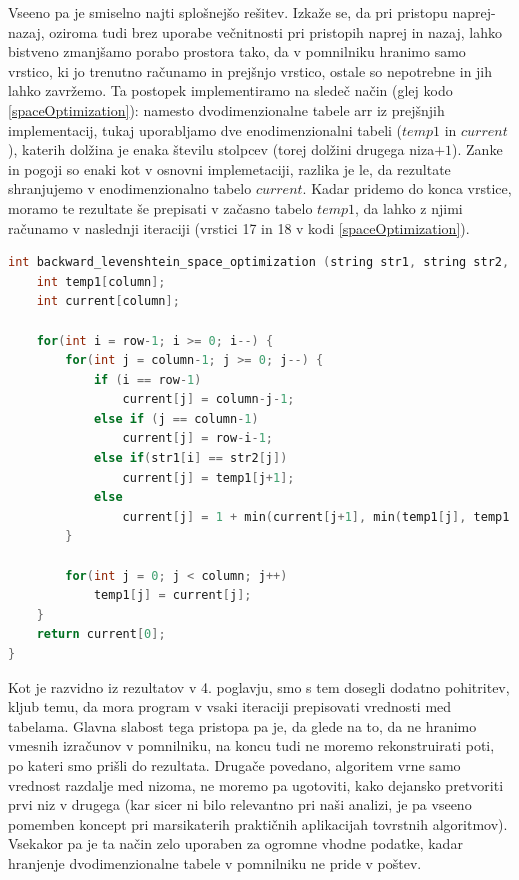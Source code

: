 \documentclass[a4paper,12pt,openright]{book}
\begin{document}
Vseeno pa je smiselno najti splošnejšo rešitev. Izkaže se, da pri pristopu naprej-nazaj, oziroma tudi brez uporabe večnitnosti pri pristopih naprej in nazaj, lahko bistveno zmanjšamo porabo prostora tako, da v pomnilniku hranimo samo vrstico, ki jo trenutno računamo in prejšnjo vrstico, ostale so nepotrebne in jih lahko zavržemo. Ta postopek implementiramo na sledeč način (glej kodo \ref{spaceOptimization}): namesto dvodimenzionalne tabele arr iz prejšnjih implementacij, tukaj uporabljamo dve enodimenzionalni tabeli ($temp1$ in $current$), katerih dolžina je enaka številu stolpcev (torej dolžini drugega niza$+ 1$). Zanke in pogoji so enaki kot v osnovni implemetaciji, razlika je le, da rezultate shranjujemo v enodimenzionalno tabelo $current$. Kadar pridemo do konca vrstice, moramo te rezultate še prepisati v začasno tabelo $temp1$, da lahko z njimi računamo v naslednji iteraciji (vrstici 17 in 18 v kodi \ref{spaceOptimization}). 

\bigskip
\bigskip

\begin{lstlisting}[language=C++, caption={Prostorska optimizacija za računanje Levenshteinove razdalje s pristopom nazaj}, captionpos=b, label=spaceOptimization]
int backward_levenshtein_space_optimization (string str1, string str2, int row, int column) {
    int temp1[column]; 
    int current[column];

    for(int i = row-1; i >= 0; i--) {
        for(int j = column-1; j >= 0; j--) {
            if (i == row-1)
                current[j] = column-j-1;
            else if (j == column-1)
                current[j] = row-i-1;
            else if(str1[i] == str2[j])
                current[j] = temp1[j+1];
            else
                current[j] = 1 + min(current[j+1], min(temp1[j], temp1[j+1]));
        }

        for(int j = 0; j < column; j++) 
            temp1[j] = current[j];
    }
    return current[0];
}
\end{lstlisting}

\bigskip
\bigskip

Kot je razvidno iz rezultatov v 4. poglavju, smo s tem dosegli dodatno pohitritev, kljub temu, da mora program v vsaki iteraciji prepisovati vrednosti med tabelama. Glavna slabost tega pristopa pa je, da glede na to, da ne hranimo vmesnih izračunov v pomnilniku, na koncu tudi ne moremo rekonstruirati poti, po kateri smo prišli do rezultata. Drugače povedano, algoritem vrne samo vrednost razdalje med nizoma, ne moremo pa ugotoviti, kako dejansko pretvoriti prvi niz v drugega (kar sicer ni bilo relevantno pri naši analizi, je pa vseeno pomemben koncept pri marsikaterih praktičnih aplikacijah tovrstnih algoritmov). Vsekakor pa je ta način zelo uporaben za ogromne vhodne podatke, kadar hranjenje dvodimenzionalne tabele v pomnilniku ne pride v poštev. 
\end{document}

